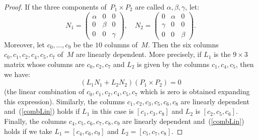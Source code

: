 \documentclass[a4paper, 11pt, reqno]{amsart}
\theoremstyle{plain}
\theoremstyle{definition}
\begin{document}
\begin{proof}
If the three components of~$P_1 \times P_2$ are called $\alpha, \beta, \gamma$, let:
%
\[
  N_1 = \left(
  \begin{array}{ccc}
    \alpha & 0 & 0 \\
    0 & \beta & 0\\
    0 & 0 & \gamma
  \end{array}
  \right), \quad
  N_2 = \left(
  \begin{array}{ccc}
    0 & \alpha & 0 \\
    \gamma & 0 & 0\\
    0 & 0 & \beta
  \end{array}
  \right).
\]
%
Moreover, let $c_0, \dots, c_9$ be the $10$ columns of~$M$. Then the six
columns $c_0, c_1, c_2, c_4, c_5, c_7$ of~$M$ are linearly dependent. More
precisely, if $L_1$ is the $9\times 3$ matrix whose columns are
$c_0, c_2, c_7$ and $L_2$ is given by the columns $c_1, c_4, c_5$,
then we have:
%
\begin{equation}
  (L_1 N_1 + L_2N_2) (P_1 \times P_2) = 0
  \label{combLin}
\end{equation}
%
(the linear combination of $c_0, c_1, c_2, c_4, c_5, c_7$ which is zero
is obtained expanding this expression).
Similarly, the columns $c_1, c_2, c_3, c_5, c_6, c_8$ are linearly dependent
and~(\ref{combLin}) holds if $L_1$ in this case is $[c_1, c_3, c_8]$ and
$L_2$ is $[c_2, c_5, c_6]$. Finally, the columns
$c_4, c_5, c_6, c_7, c_8, c_9$ are linearly dependent and~(\ref{combLin})
holds if we take $L_1 = [c_4, c_6, c_9]$ and $L_2 = [c_5, c_7, c_8]$.


\end{proof}
\end{document}
